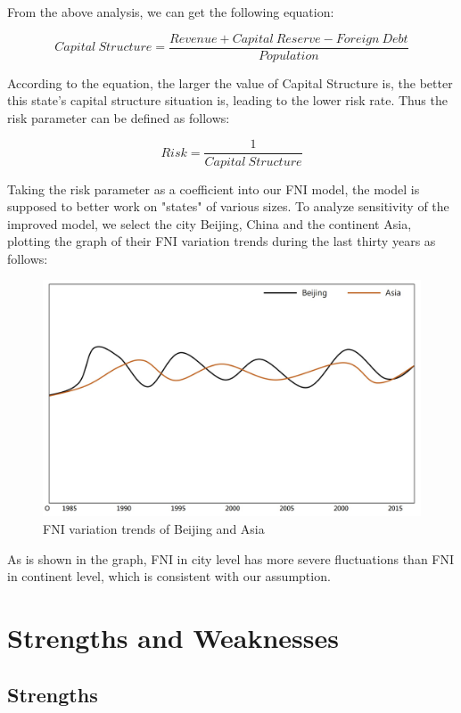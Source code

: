 \documentclass[a4paper,12pt]{article}
\begin{document}
From the above analysis, we can get the following equation: 

\begin{equation}
Capital~Structure=\frac{Revenue+Capital~Reserve-Foreign~Debt}{Population}
\end{equation}

According to the equation, the larger the value of Capital Structure is, the better this state's capital structure situation is, leading to the lower risk rate. Thus the risk parameter can be defined as follows:

\begin{equation}
Risk=\frac{1}{Capital~Structure}
\end{equation}

Taking the risk parameter as a coefficient into our FNI model, the model is supposed to better work on "states" of various sizes. To analyze sensitivity of the improved model, we select the city Beijing, China and the continent Asia, plotting the graph of their FNI variation trends during the last thirty years as follows:

\begin{figure} [H]
\centering
\includegraphics[width=\textwidth]{1.jpg}
\caption{FNI variation trends of Beijing and Asia}
\end{figure}

As is shown in the graph, FNI in city level has more severe fluctuations than FNI in continent level, which is consistent with our assumption. 

\section{Strengths and Weaknesses}
\subsection{Strengths}
\end{document}
